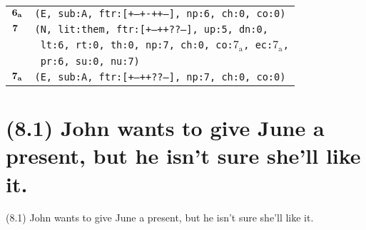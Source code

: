 \documentclass{article}
\begin{document}
\begin{minipage}{\textwidth}
{\begin{tabular}{|r|l|}
    ${\textbf{\textrm{6}}_{\textbf{\textrm{a}}}}$ & \texttt{\texttt{(E,~sub:A,~ftr:[+--+-++--],~np:6,~ch:0,~co:0)}} \\
    ${\textbf{\textrm{7}}_{\phantom{z}}}$ & \texttt{\texttt{(N,~lit:them,~ftr:[+--++??--],~up:5,~dn:0,}} \\
    & \texttt{\texttt{~lt:6,~rt:0,~th:0,~np:7,~ch:0,~co:${\textrm{7}_{\textrm{a}}}$,~ec:${\textrm{7}_{\textrm{a}}}$,}} \\
    & \texttt{\texttt{~pr:6,~su:0,~nu:7)}} \\
    ${\textbf{\textrm{7}}_{\textbf{\textrm{a}}}}$ & \texttt{\texttt{(E,~sub:A,~ftr:[+--++??--],~np:7,~ch:0,~co:0)}} \\
    \hline
  \end{tabular}
  }
\end{minipage}
\bigbreak

\clearpage

%
%

\section*{(8.1) John wants to give June a present, but he isn't sure she’ll like it.}

\bigbreak
\begin{enumerate*}
\item[(8.1)] John wants to give June a present, but he isn't sure she’ll like it.
\end{enumerate*}
\bigbreak
\end{document}
